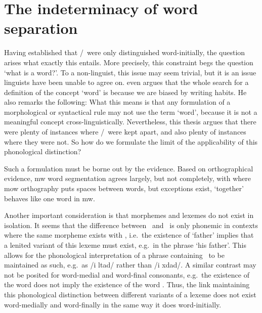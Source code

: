 \section{The indeterminacy of word separation}
\label{sec:indet-word-separ}
Having established that \lT/\xD\ were only distinguished word-initially, the question arises what exactly this entails. More precisely, this constraint begs the question `what is a word?'. To a non-linguist, this issue may seem trivial, but it is an issue linguists have been unable to agree on. \Textcite[28]{haspelmath_indeterminacy_2011} even argues that the whole search for a definition of the concept `word' is because we are biased by writing habits. He also remarks the following: 
What this means is that any formulation of a morphological or syntactical rule may not use the term `word', because it is not a meaningful concept cross-linguistically. 
Nevertheless, this thesis argues that there were plenty of instances where \lT/\xD\ were kept apart, and also plenty of instances where they were not. 
So how do we formulate the limit of the applicability of this phonological distinction?

Such a formulation must be borne out by the evidence. Based on orthographical evidence, \gls{mw} word segmentation agrees largely, but not completely, with where \gls{mow} orthography puts spaces between words, but exceptions exist, \eg {} `together' behaves like one word in \gls{mw}.

Another important consideration is that morphemes and lexemes do not exist in isolation. 
It seems that the difference between \lT\ and \xD\ is only phonemic in contexts where the same morpheme exists with \xT, i.e.\ the existence of  `father' implies that a lenited variant of this lexeme must exist, e.g.\ in the phrase  `his father'. This allows for the phonological interpretation of a phrase containing \lT\ to be maintained as such, e.g.\ as /i \gls{l}tad/ rather than /i \gls{x}dad/. A similar contrast may not be posited for word-medial and word-final consonants, e.g.\ the existence of the word  does not imply the existence of the word . Thus, the link maintaining this phonological distinction between different variants of a lexeme does not exist word-medially and word-finally in the same way it does word-initially.

